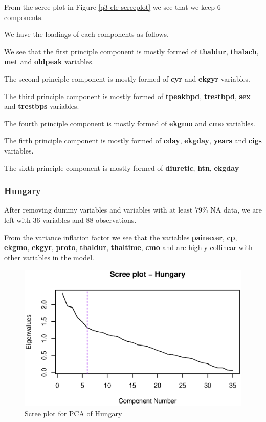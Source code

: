 \documentclass[a4paper]{article}
\begin{document}
From the scree plot in Figure \ref{q3-cle-screeplot} we see that we keep 6 components.

We have the loadings of each components as follows.



We see that the first principle component is mostly formed of \textbf{thaldur}, \textbf{thalach}, \textbf{met} and \textbf{oldpeak} variables.

The second principle component is mostly formed of \textbf{cyr} and \textbf{ekgyr} variables.

The third principle component is mostly formed of \textbf{tpeakbpd}, \textbf{trestbpd}, \textbf{sex} and \textbf{trestbps} variables.

The fourth principle component is mostly formed of \textbf{ekgmo} and \textbf{cmo} variables.

The firth principle component is mostly formed of \textbf{cday}, \textbf{ekgday}, \textbf{years} and \textbf{cigs} variables.

The sixth principle component is mostly formed of \textbf{diuretic}, \textbf{htn}, \textbf{ekgday}

\subsubsection{Hungary}

After removing dummy variables and variables with at least $79\%$ NA data, we are left with 36 variables and 88 observations. 



From the variance inflation factor we see that the variables \textbf{painexer}, \textbf{cp}, \textbf{ekgmo}, \textbf{ekgyr}, \textbf{proto}, \textbf{thaldur}, \textbf{thaltime}, \textbf{cmo} and  are highly collinear with other variables in the model.

\begin{figure}[H]
	\begin{center}
		\includegraphics[width=12cm]{question3output/hunscreeplot.eps}
	\end{center}
	\caption{Scree plot for PCA of Hungary}
	\label{q3-hun-screeplot}
\end{figure}
\end{document}
